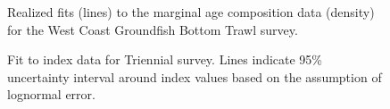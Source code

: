 \documentclass[
]{scrartcl}
\begin{document}
\begin{figure}[H]


\caption{\label{fig-marage_wcgbts}Realized fits (lines) to the marginal
age composition data (density) for the West Coast Groundfish Bottom
Trawl survey.}

\end{figure}%

\begin{figure}[H]


\caption{\label{fig-index-tri}Fit to index data for Triennial survey.
Lines indicate 95\% uncertainty interval around index values based on
the assumption of lognormal error.}

\end{figure}%
\end{document}
